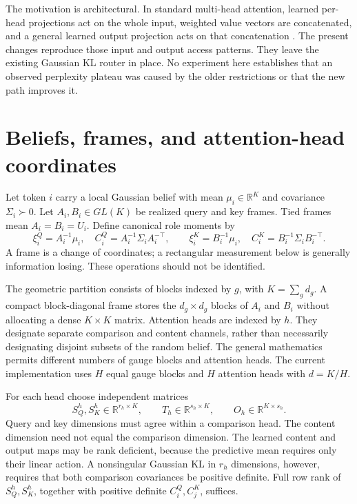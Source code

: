 \documentclass[11pt,letterpaper]{article}
\newcommand{\R}{\mathbb R}
\begin{document}
The motivation is architectural. In standard multi-head attention, learned per-head projections act on the whole input, weighted value vectors are concatenated, and a general learned output projection acts on that concatenation \cite{vaswani}. The present changes reproduce those input and output access patterns. They leave the existing Gaussian KL router in place. No experiment here establishes that an observed perplexity plateau was caused by the older restrictions or that the new path improves it.

\section{Beliefs, frames, and attention-head coordinates}
Let token $i$ carry a local Gaussian belief with mean $\mu_i\in\R^K$ and covariance $\Sigma_i\succ0$. Let $A_i,B_i\in GL(K)$ be realized query and key frames. Tied frames mean $A_i=B_i=U_i$. Define canonical role moments by
\begin{equation}
 \xi_i^Q=A_i^{-1}\mu_i,\quad C_i^Q=A_i^{-1}\Sigma_i A_i^{-\top},\qquad
 \xi_i^K=B_i^{-1}\mu_i,\quad C_i^K=B_i^{-1}\Sigma_i B_i^{-\top}.
 \label{eq:canonical}
\end{equation}
A frame is a change of coordinates; a rectangular measurement below is generally information losing. These operations should not be identified.

The geometric partition consists of blocks indexed by $g$, with $K=\sum_g d_g$. A compact block-diagonal frame stores the $d_g\times d_g$ blocks of $A_i$ and $B_i$ without allocating a dense $K\times K$ matrix. Attention heads are indexed by $h$. They designate separate comparison and content channels, rather than necessarily designating disjoint subsets of the random belief. The general mathematics permits different numbers of gauge blocks and attention heads. The current implementation uses $H$ equal gauge blocks and $H$ attention heads with $d=K/H$.

For each head choose independent matrices
\begin{equation}
 S_Q^h,S_K^h\in\R^{r_h\times K},\qquad
 T_h\in\R^{s_h\times K},\qquad O_h\in\R^{K\times s_h}.
 \label{eq:maps}
\end{equation}
Query and key dimensions must agree within a comparison head. The content dimension need not equal the comparison dimension. The learned content and output maps may be rank deficient, because the predictive mean requires only their linear action. A nonsingular Gaussian KL in $r_h$ dimensions, however, requires that both comparison covariances be positive definite. Full row rank of $S_Q^h,S_K^h$, together with positive definite $C_i^Q,C_j^K$, suffices.
\end{document}

